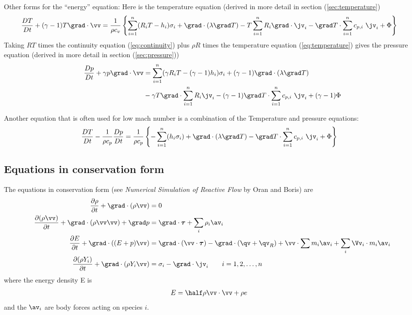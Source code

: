 \documentclass[10pt]{article}
\begin{document}
Other forms for the ``energy'' equation: Here is the temperature equation
(derived in more detail in section (\ref{sec:temperature})
\begin{align}
  {D T\over Dt} + (\gamma-1) T \grad\cdot\vv & = 
       {1\over \rho c_v}  \left\{ \sumi  (R_i T-h_i) \sigma_i + \grad\cdot(\lambda\grad T)
      - T \sumi  R_i \grad\cdot\jv_i - \grad T \cdot\sumi c_{p,i} ~ \jv_i
              + \Phi \right\} 
           \label{eq:temperature} 
\end{align}
Taking $RT$ times the continuity equation (\ref{eq:continuity}) plus $\rho R$ 
times the temperature equation (\ref{eq:temperature}) gives the pressure equation
(derived in more detail in section (\ref{sec:pressure}))
\begin{align}
    {D p\over Dt} + \gamma p \grad\cdot\vv &= 
        \sumi  (\gamma R_i T-(\gamma-1)h_i) \sigma_i + (\gamma-1) \grad\cdot(\lambda\grad T) \\
    &  - \gamma T \grad\cdot \sumi R_i\jv_i - (\gamma-1) \grad T \cdot \sumi c_{p,i} ~\jv_i
              + (\gamma-1) \Phi \label{eq:pressure}
\end{align}

Another equation that is often used for low mach number is a combination of the Temperature
and pressure equations:
\begin{align}
  {D T\over Dt} - {1\over \rho c_p} {D p\over Dt} & = 
       {1\over \rho c_p}  \left\{ -\sumi (h_i\sigma_i) + \grad\cdot(\lambda\grad T)
      - \grad T \cdot\sumi c_{p,i} ~ \jv_i
              + \Phi \right\} \label{eq:TP}
\end{align}

\subsection{Equations in conservation form}

The equations in conservation form (see {\sl Numerical Simulation of Reactive Flow} by Oran and Boris)
are
\begin{align*}
   {\partial \rho  \over \partial t} + \grad\cdot(\rho \vv)&=0 \\
   {\partial (\rho\vv)  \over \partial t}  + \grad\cdot(\rho\vv\vv) + \grad p &= \grad\cdot\tauv
              +  \sum_i \rho_i \av_i \\
   {\partial E  \over \partial t}  + \grad\cdot( (E+p)\vv ) &= \grad\cdot( \vv\cdot\tauv )
            - \grad\cdot(\qv+\qv_R) + \vv\cdot\sum m_i\av_i + \sum_i \Vv_i\cdot m_i \av_i    \\
  {\partial (\rho Y_i) \over \partial t} + \grad\cdot(\rho Y_i\vv) &= \sigma_i 
               -\grad\cdot\jv_i \qquad i=1,2,\ldots,n
\end{align*}
where the energy density E is
\begin{align*}
 E &= \half \rho \vv\cdot\vv + \rho e
\end{align*}
and the $\av_i$ are body forces acting on species $i$.
\end{document}
